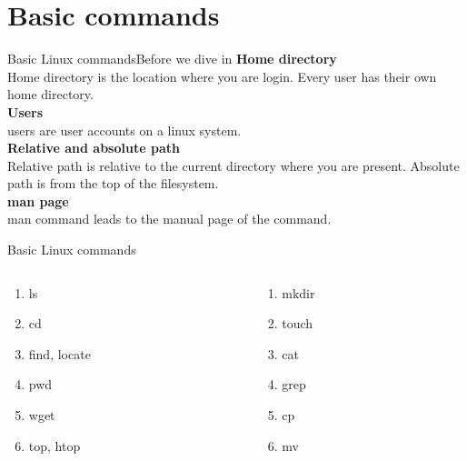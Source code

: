 \documentclass[11pt]{beamer}
\begin{document}
\section{Basic commands}
\begin{frame}{Basic Linux commands}{Before we dive in}
	\textbf{\large Home directory}\\
	Home directory is the location where you are login. Every user has their own home directory.\\
	\textbf{\large Users}\\
	users are user accounts on a linux system. \\
	\textbf{\large Relative and absolute path}\\
	Relative path is relative to the current directory where you are present.  Absolute path is from the top of the filesystem.\\
	\textbf{\large man page}\\
	man command leads to the manual page of the command.\\

\end{frame}
\begin{frame}{Basic Linux commands}

\begin{columns}
\begin{column}{0.5\textwidth}
\begin{enumerate}
	\item ls
	\item cd
	\item find, locate
	\item pwd
	\item wget 
	\item top, htop
\end{enumerate}
\end{column}
\begin{column}{0.5\textwidth}
   \begin{enumerate}
	\item mkdir
	\item touch
	\item cat
	\item grep
	\item cp
	\item mv
\end{enumerate}
\end{column}
\end{columns}
\end{frame}
\end{document}
